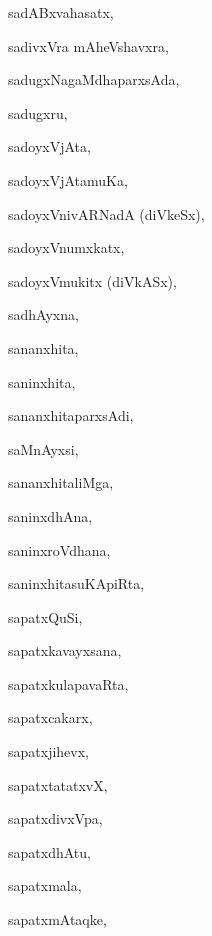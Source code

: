 \begin{multicols}{3}
{\noindent
{sadABxvahasatx}, \pageref{sadABxvahasatx}

\noindent
{sadivxVra mAheVshavxra}, \pageref{sadivxVramAheVshavxra}

\noindent
{sadugxNagaMdhaparxsAda}, \pageref{sadugxNagaMdhaparxsAda}

\noindent
{sadugxru}, \pageref{sadugxru}

\noindent
{sadoyxVjAta}, \pageref{sadoyxVjAta}

\noindent
{sadoyxVjAtamuKa}, \pageref{sadoyxVjAtamuKa}

\noindent
{sadoyxVnivARNadA (diVkeSx)}, \pageref{sadoyxVnivARNadAdiVkeSx}

\noindent
{sadoyxVnumxkatx}, \pageref{sadoyxVnumxkatx}

\noindent
{sadoyxVmukitx (diVkASx)}, \pageref{sadoyxVmukitxdiVkASx}

\noindent
{sadhAyxna}, \pageref{sadhAyxna}

\noindent
{sananxhita}, \pageref{sananxhita}

\noindent
{saninxhita}, \pageref{saninxhita}

\noindent
{sananxhitaparxsAdi}, \pageref{sananxhitaparxsAdi}

\noindent
{saMnAyxsi}, \pageref{saMnAyxsi}

\noindent
{sananxhitaliMga}, \pageref{sananxhitaliMga}

\noindent
{saninxdhAna}, \pageref{saninxdhAna}

\noindent
{saninxroVdhana}, \pageref{saninxroVdhana}

\noindent
{saninxhitasuKApiRta}, \pageref{saninxhitasuKApiRta}

\noindent
{sapatxQuSi}, \pageref{sapatxQuSi}

\noindent
{sapatxkavayxsana}, \pageref{sapatxkavayxsana}

\noindent
{sapatxkulapavaRta}, \pageref{sapatxkulapavaRta}

\noindent
{sapatxcakarx}, \pageref{sapatxcakarx}

\noindent
{sapatxjihevx}, \pageref{sapatxjihevx}

\noindent
{sapatxtatatxvX}, \pageref{sapatxtatatxvX}

\noindent
{sapatxdivxVpa}, \pageref{sapatxdivxVpa}

\noindent
{sapatxdhAtu}, \pageref{sapatxdhAtu}

\noindent
{sapatxmala}, \pageref{sapatxmala}

\noindent
{sapatxmAtaqke}, \pageref{sapatxmAtaqke1}

}
\end{multicols}
